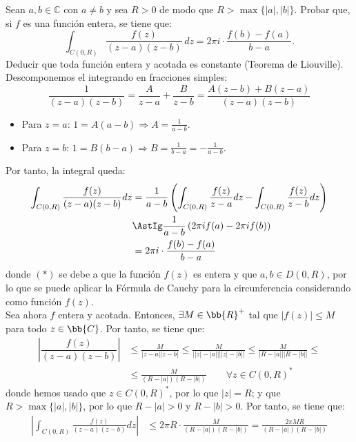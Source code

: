 \documentclass[12pt]{article}
\begin{document}
    \begin{ejercicio}[3 puntos]
        Sean $a,b \in \mathbb{C}$ con $a \neq b$ y sea $R > 0$ de modo que $R > \max\{|a|,|b|\}$. Probar que, si $f$ es una función entera, se tiene que:
        \[
            \int_{C(0,R)} \dfrac{f(z)}{(z-a)(z-b)} \, dz = 2\pi i \cdot \dfrac{f(b) - f(a)}{b-a}.
        \]
        Deducir que toda función entera y acotada es constante (Teorema de Liouville).\\

        Descomponemos el integrando en fracciones simples:
    \begin{equation*}
        \frac{1}{(z-a)(z-b)} = \frac{A}{z-a} + \frac{B}{z-b} = \frac{A(z-b)+B(z-a)}{(z-a)(z-b)}
    \end{equation*}
    \begin{itemize}
        \item Para $z=a$: $1=A(a-b)\Longrightarrow A=\frac{1}{a-b}$.
        \item Para $z=b$: $1=B(b-a)\Longrightarrow B=\frac{1}{b-a}=-\frac{1}{a-b}$.
    \end{itemize}

    Por tanto, la integral queda:
    \begin{align*}
        \int_{C(0,R)} \frac{f(z)}{(z-a)(z-b)}dz &= \frac{1}{a-b}\left(\int_{C(0,R)} \frac{f(z)}{z-a}dz - \int_{C(0,R)} \frac{f(z)}{z-b}dz\right)\\
        &\AstIg \frac{1}{a-b}\left(2\pi i f(a) - 2\pi i f(b)\right)\\
        &= 2\pi i \cdot \frac{f(b)-f(a)}{b-a}
    \end{align*}
    donde $(\ast)$ se debe a que la función $f(z)$ es entera y que $a,b\in D(0,R)$, por lo que se puede aplicar la Fórmula de Cauchy para la circunferencia considerando como función $f(z)$.\\

    Sea ahora $f$ entera y acotada. Entonces, $\exists M\in \bb{R}^+$ tal que $|f(z)|\leq M$ para todo $z\in \bb{C}$. Por tanto, se tiene que:
    \begin{align*}
        \left|\dfrac{f(z)}{(z-a)(z-b)}\right| &\leq \frac{M}{|z-a||z-b|}
        \leq \frac{M}{\left||z| - |a|\right|\left||z| - |b|\right|}
        \leq \frac{M}{\left|R - |a|\right|\left|R - |b|\right|}
        \leq\\&\leq  \frac{M}{(R-|a|)(R-|b|)}\qquad \forall z\in C(0,R)^*
    \end{align*}
    donde hemos usado que $z\in C(0,R)^*$, por lo que $|z|=R$; y que $R>\max\{|a|,|b|\}$, por lo que $R-|a|>0$ y $R-|b|>0$. Por tanto, se tiene que:
    \begin{align*}
        \left|\int_{C(0,R)} \frac{f(z)}{(z-a)(z-b)}dz\right| &\leq 2\pi R \cdot \frac{M}{(R-|a|)(R-|b|)} = \frac{2\pi M R}{(R-|a|)(R-|b|)}
    \end{align*}


\end{ejercicio}
\end{document}
